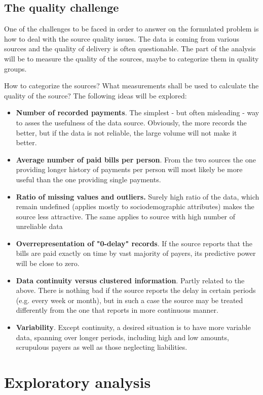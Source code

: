 \documentclass{article}
\begin{document}
\subsection{The quality challenge}
One of the challenges to be faced in order to answer on the formulated problem is how to deal with the source quality issues. The data is coming from various sources and the quality of delivery is often questionable. The part of the analysis will be to measure the quality of the sources, maybe to categorize them in quality groups.\par
How to categorize the sources? What measurements shall be used to calculate the quality of the source? The following ideas will be explored:
\begin{itemize}
    \item \textbf{Number of recorded payments}. The simplest - but often misleading - way to asses the usefulness of the data source. Obviously, the more records the better, but if the data is not reliable, the large volume will not make it better.
    \item \textbf{Average number of paid bills per person}. From the two sources the one providing longer history of payments per person will most likely be more useful than the one providing single payments.
    \item \textbf{Ratio of missing values and outliers.} Surely high ratio of the data, which remain undefined (applies mostly to sociodemographic attributes) makes the source less attractive. The same applies to source with high number of unreliable data
    \item \textbf{Overrepresentation of "0-delay" records}. If the source reports that the bills are paid exactly on time by vast majority of payers, its predictive power will be close to zero.
    \item \textbf{Data continuity versus clustered information}. Partly related to the above. There is nothing bad if the source reports the delay in certain periods (e.g. every week or month), but in such a case the source may be treated differently from the one that reports in more continuous manner.
    \item \textbf{Variability}. Except continuity, a desired situation is to have more variable data, spanning over longer periods, including high and low amounts, scrupulous payers as well as those neglecting liabilities.
\end{itemize}

\pagebreak

\section{Exploratory analysis}
\end{document}
